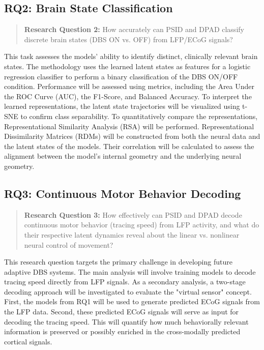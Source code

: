 \documentclass[12pt, letterpaper]{article}
\begin{document}
\subsection{RQ2: Brain State Classification}

\begin{quote}

    \textbf{Research Question 2:} How accurately can PSID and DPAD classify discrete brain states (DBS ON vs. OFF) from LFP/ECoG signals?

\end{quote}

This task assesses the models' ability to identify distinct, clinically relevant brain states. The methodology uses the learned latent states as features for a logistic regression classifier to perform a binary classification of the DBS ON/OFF condition. Performance will be assessed using metrics, including the Area Under the ROC Curve (AUC), the F1-Score, and Balanced Accuracy. To interpret the learned representations, the latent state trajectories will be visualized using t-SNE to confirm class separability. To quantitatively compare the representations, Representational Similarity Analysis (RSA) will be performed. Representational Dissimilarity Matrices (RDMs) will be constructed from both the neural data and the latent states of the models. Their correlation will be calculated to assess the alignment between the model's internal geometry and the underlying neural geometry.


\subsection{RQ3: Continuous Motor Behavior Decoding}
\begin{quote}
    \textbf{Research Question 3:} How effectively can PSID and DPAD decode continuous motor behavior (tracing speed) from LFP activity, and what do their respective latent dynamics reveal about the linear vs. nonlinear neural control of movement?
\end{quote}

This research question targets the primary challenge in developing future adaptive DBS systems. The main analysis will involve training models to decode tracing speed directly from LFP signals. As a secondary analysis, a two-stage decoding approach will be investigated to evaluate the "virtual sensor" concept. First, the models from RQ1 will be used to generate predicted ECoG signals from the LFP data. Second, these predicted ECoG signals will serve as input for decoding the tracing speed. This will quantify how much behaviorally relevant information is preserved or possibly enriched in the cross-modally predicted cortical signals.
\end{document}
